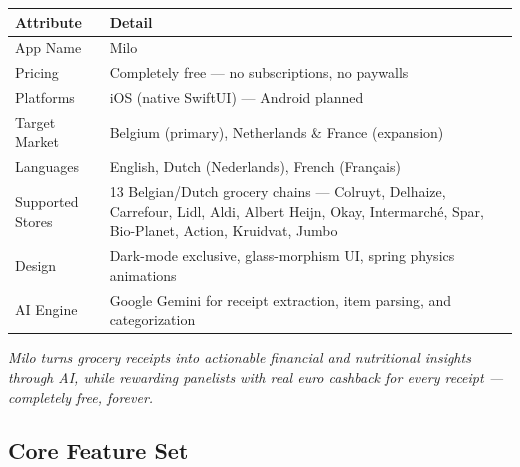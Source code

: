 \documentclass[11pt,a4paper]{article}
\begin{document}
\begin{center}
\renewcommand{\arraystretch}{1.3}
\begin{tabularx}{\textwidth}{L{3.5cm} L{10cm}}
\toprule
{}
\textbf{\color{white}Attribute} & \textbf{\color{white}Detail} \\
\midrule
App Name & Milo \\
Pricing & Completely free --- no subscriptions, no paywalls \\
Platforms & iOS (native SwiftUI) --- Android planned \\
Target Market & Belgium (primary), Netherlands \& France (expansion) \\
Languages & English, Dutch (Nederlands), French (Fran\c{c}ais) \\
Supported Stores & 13 Belgian/Dutch grocery chains --- Colruyt, Delhaize, Carrefour, Lidl, Aldi, Albert Heijn, Okay, Intermarch\'{e}, Spar, Bio-Planet, Action, Kruidvat, Jumbo \\
Design & Dark-mode exclusive, glass-morphism UI, spring physics animations \\
AI Engine & Google Gemini for receipt extraction, item parsing, and categorization \\
\bottomrule
\end{tabularx}
\end{center}

\vspace{0.5em}

{\color{milogray}\itshape\small Milo turns grocery receipts into actionable financial and nutritional insights through AI, while rewarding panelists with real euro cashback for every receipt --- completely free, forever.}

\subsection{Core Feature Set}
\end{document}
